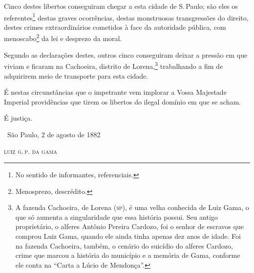 Cinco destes libertos conseguiram chegar a esta cidade de S.\,Paulo; são
eles os referentes\footnote{No sentido de informantes, referenciais.}
destas graves ocorrências, destas monstruosas transgressões do direito,
destes crimes extraordinários cometidos à face da autoridade pública,
com menoscabo\footnote{Menosprezo, descrédito.} da lei e desprezo da
moral.

Segundo as declarações destes, outros cinco conseguiram deixar a pressão
em que viviam e ficaram na Cachoeira, distrito de Lorena,\footnote{A
  fazenda Cachoeira, de Lorena (\textsc{sp}), é uma velha conhecida de Luiz Gama,
  o que só aumenta a singularidade que essa história possui. Seu antigo
  proprietário, o alferes Antônio Pereira Cardozo, foi o senhor de
  escravos que comprou Luiz Gama, quando ele ainda tinha apenas dez anos
  de idade. Foi na fazenda Cachoeira, também, o cenário do suicídio do
  alferes Cardozo, crime que marcou a história do município e a memória
  de Gama, conforme ele conta na ``Carta a Lúcio de Mendonça''.}
trabalhando a fim de
adquirirem meio de transporte para esta cidade.

É nestas circunstâncias que o impetrante vem implorar a Vossa Majestade
Imperial providências que tirem os libertos do ilegal domínio em que se
acham.

É justiça.

\medskip

\hfill\ São Paulo, 2 de agosto de 1882

\hfill\textsc{luiz g.\,p. da gama}

